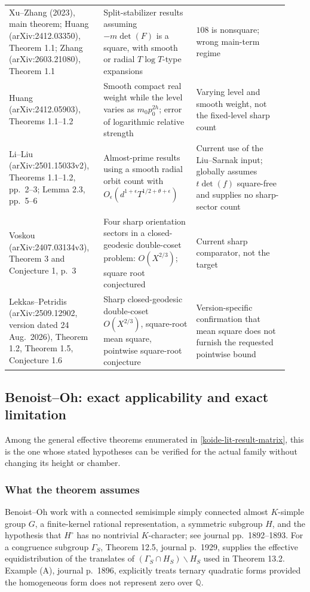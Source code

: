 \begin{longtable}[]{@{}
  >{\raggedright\arraybackslash}p{0.31\linewidth}
  >{\raggedright\arraybackslash}p{0.31\linewidth}
  >{\raggedright\arraybackslash}p{0.31\linewidth}@{}}
Xu--Zhang (2023), main theorem; Huang (arXiv:2412.03350), Theorem 1.1; Zhang (arXiv:2603.21080), Theorem 1.1 & Split-stabilizer results assuming \(-m\det(F)\) is a square, with smooth or radial \(T\log T\)-type expansions & \(108\) is nonsquare; wrong main-term regime \\
Huang (arXiv:2412.05903), Theorems 1.1--1.2 & Smooth compact real weight while the level varies as \(m_0p_0^{2h}\); error of logarithmic relative strength & Varying level and smooth weight, not the fixed-level sharp count \\
Li--Liu (arXiv:2501.15033v2), Theorems 1.1--1.2, pp.~2--3; Lemma 2.3, pp.~5--6 & Almost-prime results using a smooth radial orbit count with \(O_\epsilon(d^{1+\epsilon}T^{1/2+\theta+\epsilon})\) & Current use of the Liu--Sarnak input; globally assumes \(t\det(f)\) square-free and supplies no sharp-sector count \\
Voskou (arXiv:2407.03134v3), Theorem 3 and Conjecture 1, p.~3 & Four sharp orientation sectors in a closed-geodesic double-coset problem: \(O(X^{2/3})\); square root conjectured & Current sharp comparator, not the target \\
Lekkas--Petridis (arXiv:2509.12902, version dated 24 Aug.~2026), Theorem 1.2, Theorem 1.5, Conjecture 1.6 & Sharp closed-geodesic double-coset \(O(X^{2/3})\), square-root mean square, pointwise square-root conjecture & Version-specific confirmation that mean square does not furnish the requested pointwise bound \\
\end{longtable}

\subsection{Benoist--Oh: exact applicability and exact limitation}\label{koide-lit-benoistoh-exact-applicability-and-exact-limitation}

Among the general effective theorems enumerated in
\cref{koide-lit-result-matrix}, this is the one whose stated hypotheses can
be verified for the actual family without changing its height or chamber.

\subsubsection{What the theorem assumes}\label{koide-lit-what-the-theorem-assumes}

Benoist--Oh work with a connected semisimple simply connected almost \(K\)-simple group \(G\), a finite-kernel rational representation, a symmetric subgroup \(H\), and the hypothesis that \(H^\circ\) has no nontrivial \(K\)-character; see journal pp.~1892--1893. For a congruence subgroup \(\Gamma_S\), Theorem 12.5, journal p.~1929, supplies the effective equidistribution of the translates of \((\Gamma_S\cap H_S)\backslash H_S\) used in Theorem 13.2. Example (A), journal p.~1896, explicitly treats ternary quadratic forms provided the homogeneous form does not represent zero over \(\mathbb Q\).

